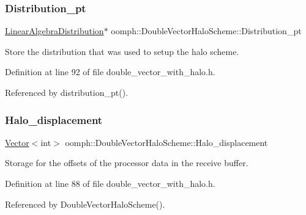 \subsubsection{\texorpdfstring{Distribution\+\_\+pt}{Distribution\_pt}}
{\footnotesize\ttfamily \hyperlink{classoomph_1_1LinearAlgebraDistribution}{Linear\+Algebra\+Distribution}$\ast$ oomph\+::\+Double\+Vector\+Halo\+Scheme\+::\+Distribution\+\_\+pt\hspace{0.3cm}{\ttfamily [private]}}



Store the distribution that was used to setup the halo scheme. 



Definition at line 92 of file double\+\_\+vector\+\_\+with\+\_\+halo.\+h.



Referenced by distribution\+\_\+pt().

\mbox{\label{classoomph_1_1DoubleVectorHaloScheme_a4357c43e12dbadede7f9852a96db4391}} 
\subsubsection{\texorpdfstring{Halo\+\_\+displacement}{Halo\_displacement}}
{\footnotesize\ttfamily \hyperlink{classoomph_1_1Vector}{Vector}$<$int$>$ oomph\+::\+Double\+Vector\+Halo\+Scheme\+::\+Halo\+\_\+displacement\hspace{0.3cm}{\ttfamily [private]}}



Storage for the offsets of the processor data in the receive buffer. 



Definition at line 88 of file double\+\_\+vector\+\_\+with\+\_\+halo.\+h.



Referenced by Double\+Vector\+Halo\+Scheme().

\mbox{\label{classoomph_1_1DoubleVectorHaloScheme_ae9dc75c67359f762bd09bdaf904158fe}} 
